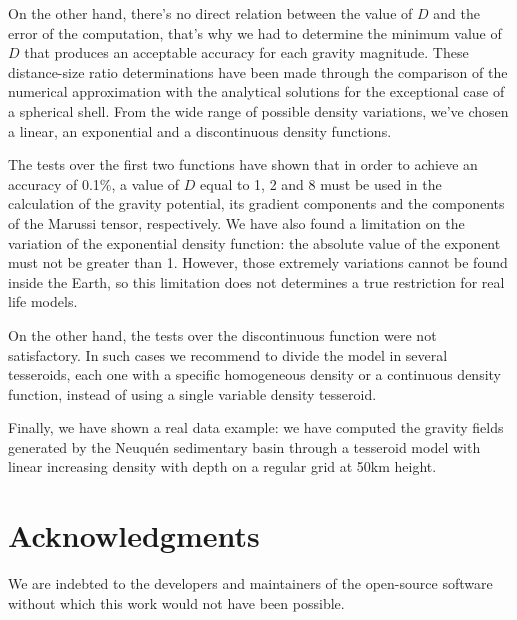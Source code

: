 \documentclass[extra]{gji}
\begin{document}
On the other hand, there's no direct relation between the value of $D$ and the error of the computation, that's why we had to determine the minimum value of $D$ that produces an acceptable accuracy for each gravity magnitude.
These distance-size ratio determinations have been made through the comparison of the numerical approximation with the analytical solutions for the exceptional case of a spherical shell.
From the wide range of possible density variations, we've chosen a linear, an exponential and a discontinuous density functions.

The tests over the first two functions have shown that in order to achieve an accuracy of 0.1\%, a value of $D$ equal to 1, 2 and 8 must be used in the calculation of the gravity potential, its gradient components and the components of the Marussi tensor, respectively.
We have also found a limitation on the variation of the exponential density function: the absolute value of the exponent must not be greater than 1.
However, those extremely variations cannot be found inside the Earth, so this limitation does not determines a true restriction for real life models.

On the other hand, the tests over the discontinuous function were not satisfactory.
In such cases we recommend to divide the model in several tesseroids, each one with a specific homogeneous density or a continuous density function, instead of using a single variable density tesseroid.

Finally, we have shown a real data example: we have computed the gravity fields generated by the Neuqu\'en sedimentary basin through a tesseroid model with linear increasing density with depth on a regular grid at 50km height.



\section{Acknowledgments}

We are indebted to the developers and maintainers of the open-source
software without which this work would not have been possible.




\end{document}
